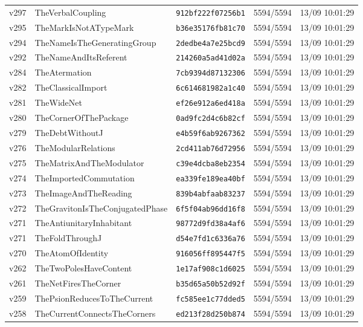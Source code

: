 \documentclass[11pt]{article}
\theoremstyle{definition}\newtheorem{deriv}{Derivation}
\begin{document}
{\begin{longtable}{@{}lllll@{}}
v297 & TheVerbalCoupling & \texttt{912bf222f07256b1} & 5594/5594 & 13/09 10:01:29 \\
v295 & TheMarkIsNotATypeMark & \texttt{b36e35176fb81c70} & 5594/5594 & 13/09 10:01:29 \\
v294 & TheNameIsTheGeneratingGroup & \texttt{2dedbe4a7e25bcd9} & 5594/5594 & 13/09 10:01:29 \\
v292 & TheNameAndItsReferent & \texttt{214260a5ad41d02a} & 5594/5594 & 13/09 10:01:29 \\
v284 & TheAtermation & \texttt{7cb9394d87132306} & 5594/5594 & 13/09 10:01:29 \\
v282 & TheClassicalImport & \texttt{6c614681982a1c40} & 5594/5594 & 13/09 10:01:29 \\
v281 & TheWideNet & \texttt{ef26e912a6ed418a} & 5594/5594 & 13/09 10:01:29 \\
v280 & TheCornerOfThePackage & \texttt{0ad9fc2d4c6b82cf} & 5594/5594 & 13/09 10:01:29 \\
v279 & TheDebtWithoutJ & \texttt{e4b59f6ab9267362} & 5594/5594 & 13/09 10:01:29 \\
v276 & TheModularRelations & \texttt{2cd411ab76d72956} & 5594/5594 & 13/09 10:01:29 \\
v275 & TheMatrixAndTheModulator & \texttt{c39e4dcba8eb2354} & 5594/5594 & 13/09 10:01:29 \\
v274 & TheImportedCommutation & \texttt{ea339fe189ea40bf} & 5594/5594 & 13/09 10:01:29 \\
v273 & TheImageAndTheReading & \texttt{839b4abfaab83237} & 5594/5594 & 13/09 10:01:29 \\
v272 & TheGravitonIsTheConjugatedPhase & \texttt{6f5f04ab96dd16f8} & 5594/5594 & 13/09 10:01:29 \\
v271 & TheAntiunitaryInhabitant & \texttt{98772d9fd38a4af6} & 5594/5594 & 13/09 10:01:29 \\
v271 & TheFoldThroughJ & \texttt{d54e7fd1c6336a76} & 5594/5594 & 13/09 10:01:29 \\
v270 & TheAtomOfIdentity & \texttt{916056ff895447f5} & 5594/5594 & 13/09 10:01:29 \\
v262 & TheTwoPolesHaveContent & \texttt{1e17af908c1d6025} & 5594/5594 & 13/09 10:01:29 \\
v261 & TheNetFiresTheCorner & \texttt{b35d65a50b52d92f} & 5594/5594 & 13/09 10:01:29 \\
v259 & ThePsionReducesToTheCurrent & \texttt{fc585ee1c77dded5} & 5594/5594 & 13/09 10:01:29 \\
v258 & TheCurrentConnectsTheCorners & \texttt{ed213f28d250b874} & 5594/5594 & 13/09 10:01:29 \\

\end{longtable}}
\end{document}
